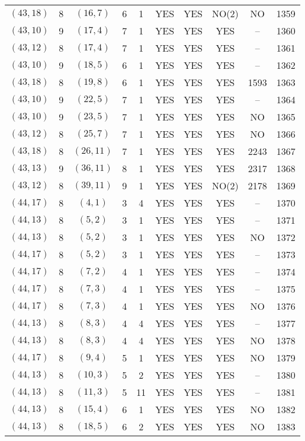 \begin{longtable}{|c|c|c|c|c|c|c|c|c|c|}
$(43, 18)$ & 8 & $(16, 7)$ & 6 & 1 & YES & YES & NO(2) & NO & 1359\\
$(43, 10)$ & 9 & $(17, 4)$ & 7 & 1 & YES & YES & YES & -- & 1360\\
$(43, 12)$ & 8 & $(17, 4)$ & 7 & 1 & YES & YES & YES & -- & 1361\\
$(43, 10)$ & 9 & $(18, 5)$ & 6 & 1 & YES & YES & YES & -- & 1362\\
$(43, 18)$ & 8 & $(19, 8)$ & 6 & 1 & YES & YES & YES & 1593 & 1363\\
$(43, 10)$ & 9 & $(22, 5)$ & 7 & 1 & YES & YES & YES & -- & 1364\\
$(43, 10)$ & 9 & $(23, 5)$ & 7 & 1 & YES & YES & YES & NO & 1365\\
$(43, 12)$ & 8 & $(25, 7)$ & 7 & 1 & YES & YES & YES & NO & 1366\\
$(43, 18)$ & 8 & $(26, 11)$ & 7 & 1 & YES & YES & YES & 2243 & 1367\\
$(43, 13)$ & 9 & $(36, 11)$ & 8 & 1 & YES & YES & YES & 2317 & 1368\\
$(43, 12)$ & 8 & $(39, 11)$ & 9 & 1 & YES & YES & NO(2) & 2178 & 1369\\
$(44, 17)$ & 8 & $(4, 1)$ & 3 & 4 & YES & YES & YES & -- & 1370\\
$(44, 13)$ & 8 & $(5, 2)$ & 3 & 1 & YES & YES & YES & -- & 1371\\
$(44, 13)$ & 8 & $(5, 2)$ & 3 & 1 & YES & YES & YES & NO & 1372\\
$(44, 17)$ & 8 & $(5, 2)$ & 3 & 1 & YES & YES & YES & -- & 1373\\
$(44, 17)$ & 8 & $(7, 2)$ & 4 & 1 & YES & YES & YES & -- & 1374\\
$(44, 17)$ & 8 & $(7, 3)$ & 4 & 1 & YES & YES & YES & -- & 1375\\
$(44, 17)$ & 8 & $(7, 3)$ & 4 & 1 & YES & YES & YES & NO & 1376\\
$(44, 13)$ & 8 & $(8, 3)$ & 4 & 4 & YES & YES & YES & -- & 1377\\
$(44, 13)$ & 8 & $(8, 3)$ & 4 & 4 & YES & YES & YES & NO & 1378\\
$(44, 17)$ & 8 & $(9, 4)$ & 5 & 1 & YES & YES & YES & NO & 1379\\
$(44, 13)$ & 8 & $(10, 3)$ & 5 & 2 & YES & YES & YES & -- & 1380\\
$(44, 13)$ & 8 & $(11, 3)$ & 5 & 11 & YES & YES & YES & -- & 1381\\
$(44, 13)$ & 8 & $(15, 4)$ & 6 & 1 & YES & YES & YES & NO & 1382\\
$(44, 13)$ & 8 & $(18, 5)$ & 6 & 2 & YES & YES & YES & NO & 1383\\

\end{longtable}
